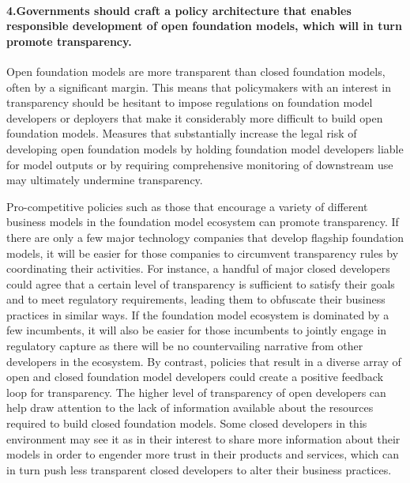 \paragraph{4.\phantom{X}Governments should craft a policy architecture that enables responsible development of open foundation models, which will in turn promote transparency.}
\begin{myitemize}
\item Open foundation models are more transparent than closed foundation models, often by a significant margin. 
This means that policymakers with an interest in transparency should be hesitant to impose regulations on foundation model developers or deployers that make it considerably more difficult to build open foundation models. 
Measures that substantially increase the legal risk of developing open foundation models by holding foundation model developers liable for model outputs or by requiring comprehensive monitoring of downstream use may ultimately undermine transparency.
\item Pro-competitive policies such as those that encourage a variety of different business models in the foundation model ecosystem can promote transparency. 
If there are only a few major technology companies that develop flagship foundation models, it will be easier for those companies to circumvent transparency rules by coordinating their activities. 
For instance, a handful of major closed developers could agree that a certain level of transparency is sufficient to satisfy their goals and to meet regulatory requirements, leading them to obfuscate their business practices in similar ways.
If the foundation model ecosystem is dominated by a few incumbents, it will also be easier for those incumbents to jointly engage in regulatory capture as there will be no countervailing narrative from other developers in the ecosystem.
By contrast, policies that result in a diverse array of open and closed foundation model developers could create a positive feedback loop for transparency.
The higher level of transparency of open developers can help draw attention to the lack of information available about the resources required to build closed foundation models.
Some closed developers in this environment may see it as in their interest to share more information about their models in order to engender more trust in their products and services, which can in turn push less transparent closed developers to alter their business practices.
\end{myitemize}